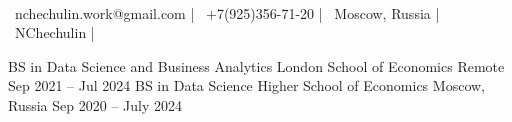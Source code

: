 \documentclass[a4paper, 10pt]{awesome-cv}
\begin{document}
\begin{center}
	  \\
	\vspace{2mm}
	{\faEnvelope\ nchechulin.work@gmail.com} | {\faMobile\ +7(925)356-71-20} | {\faMapMarker\ Moscow, Russia} | {\faGithub\ NChechulin} | {\faTelegram\ \@NChechulin}
\end{center}
\vspace{-2mm}
\begin{cventries}
	\cventry
	{BS in Data Science and Business Analytics}
	{London School of Economics}
	{Remote}
	{Sep 2021 – Jul 2024}
	{}
	\cventry
	{BS in Data Science}
	{Higher School of Economics}
	{Moscow, Russia}
	{Sep 2020 – July 2024}
	{}
\end{cventries}
\end{document}
